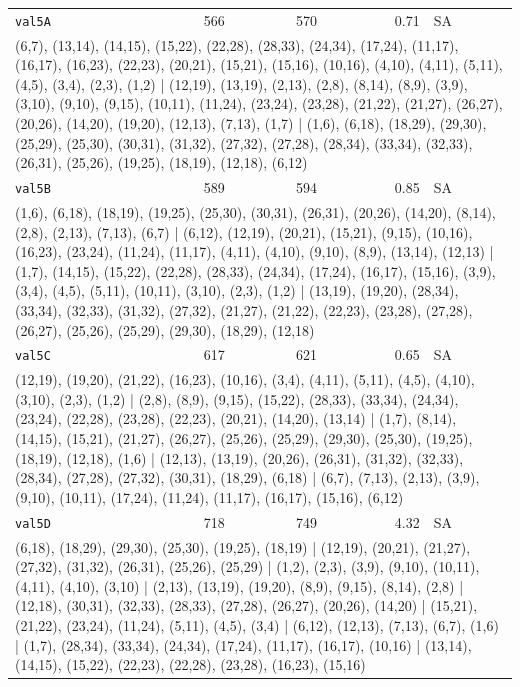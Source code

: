\begin{longtable}{lrrrl}
\texttt{val5A} & 566 & 570 & 0.71 & SA \\
\multicolumn{5}{p{0.96\linewidth}}{\tiny\raggedright\arraybackslash (6,7), (13,14), (14,15), (15,22), (22,28), (28,33), (24,34), (17,24), (11,17), (16,17), (16,23), (22,23), (20,21), (15,21), (15,16), (10,16), (4,10), (4,11), (5,11), (4,5), (3,4), (2,3), (1,2) | (12,19), (13,19), (2,13), (2,8), (8,14), (8,9), (3,9), (3,10), (9,10), (9,15), (10,11), (11,24), (23,24), (23,28), (21,22), (21,27), (26,27), (20,26), (14,20), (19,20), (12,13), (7,13), (1,7) | (1,6), (6,18), (18,29), (29,30), (25,29), (25,30), (30,31), (31,32), (27,32), (27,28), (28,34), (33,34), (32,33), (26,31), (25,26), (19,25), (18,19), (12,18), (6,12)} \\[2pt]
\texttt{val5B} & 589 & 594 & 0.85 & SA \\
\multicolumn{5}{p{0.96\linewidth}}{\tiny\raggedright\arraybackslash (1,6), (6,18), (18,19), (19,25), (25,30), (30,31), (26,31), (20,26), (14,20), (8,14), (2,8), (2,13), (7,13), (6,7) | (6,12), (12,19), (20,21), (15,21), (9,15), (10,16), (16,23), (23,24), (11,24), (11,17), (4,11), (4,10), (9,10), (8,9), (13,14), (12,13) | (1,7), (14,15), (15,22), (22,28), (28,33), (24,34), (17,24), (16,17), (15,16), (3,9), (3,4), (4,5), (5,11), (10,11), (3,10), (2,3), (1,2) | (13,19), (19,20), (28,34), (33,34), (32,33), (31,32), (27,32), (21,27), (21,22), (22,23), (23,28), (27,28), (26,27), (25,26), (25,29), (29,30), (18,29), (12,18)} \\[2pt]
\texttt{val5C} & 617 & 621 & 0.65 & SA \\
\multicolumn{5}{p{0.96\linewidth}}{\tiny\raggedright\arraybackslash (12,19), (19,20), (21,22), (16,23), (10,16), (3,4), (4,11), (5,11), (4,5), (4,10), (3,10), (2,3), (1,2) | (2,8), (8,9), (9,15), (15,22), (28,33), (33,34), (24,34), (23,24), (22,28), (23,28), (22,23), (20,21), (14,20), (13,14) | (1,7), (8,14), (14,15), (15,21), (21,27), (26,27), (25,26), (25,29), (29,30), (25,30), (19,25), (18,19), (12,18), (1,6) | (12,13), (13,19), (20,26), (26,31), (31,32), (32,33), (28,34), (27,28), (27,32), (30,31), (18,29), (6,18) | (6,7), (7,13), (2,13), (3,9), (9,10), (10,11), (17,24), (11,24), (11,17), (16,17), (15,16), (6,12)} \\[2pt]
\texttt{val5D} & 718 & 749 & 4.32 & SA \\
\multicolumn{5}{p{0.96\linewidth}}{\tiny\raggedright\arraybackslash (6,18), (18,29), (29,30), (25,30), (19,25), (18,19) | (12,19), (20,21), (21,27), (27,32), (31,32), (26,31), (25,26), (25,29) | (1,2), (2,3), (3,9), (9,10), (10,11), (4,11), (4,10), (3,10) | (2,13), (13,19), (19,20), (8,9), (9,15), (8,14), (2,8) | (12,18), (30,31), (32,33), (28,33), (27,28), (26,27), (20,26), (14,20) | (15,21), (21,22), (23,24), (11,24), (5,11), (4,5), (3,4) | (6,12), (12,13), (7,13), (6,7), (1,6) | (1,7), (28,34), (33,34), (24,34), (17,24), (11,17), (16,17), (10,16) | (13,14), (14,15), (15,22), (22,23), (22,28), (23,28), (16,23), (15,16)} \\[2pt]

\end{longtable}
